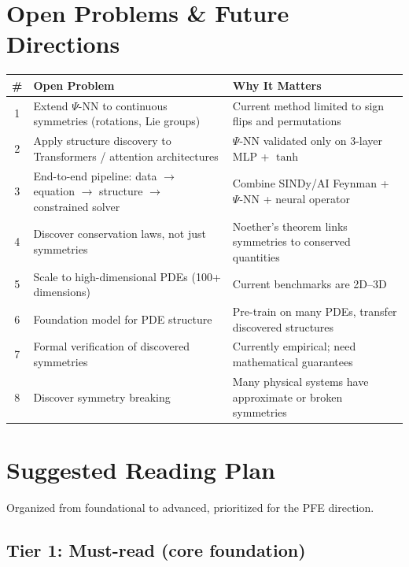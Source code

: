 \documentclass[11pt,a4paper]{article}
\begin{document}
\section{Open Problems \& Future Directions}

\begin{center}
\renewcommand{\arraystretch}{1.4}
\begin{tabular}{@{}c p{5cm} p{6.5cm}@{}}
\toprule
\textbf{\#} & \textbf{Open Problem} & \textbf{Why It Matters} \\
\midrule
1 & Extend $\Psi$-NN to continuous symmetries (rotations, Lie groups) & Current method limited to sign flips and permutations \\
2 & Apply structure discovery to Transformers / attention architectures & $\Psi$-NN validated only on 3-layer MLP + $\tanh$ \\
3 & End-to-end pipeline: data $\to$ equation $\to$ structure $\to$ constrained solver & Combine SINDy/AI Feynman + $\Psi$-NN + neural operator \\
4 & Discover conservation laws, not just symmetries & Noether's theorem links symmetries to conserved quantities \\
5 & Scale to high-dimensional PDEs (100+ dimensions) & Current benchmarks are 2D--3D \\
6 & Foundation model for PDE structure & Pre-train on many PDEs, transfer discovered structures \\
7 & Formal verification of discovered symmetries & Currently empirical; need mathematical guarantees \\
8 & Discover symmetry breaking & Many physical systems have approximate or broken symmetries \\
\bottomrule
\end{tabular}
\end{center}

\section{Suggested Reading Plan}

Organized from foundational to advanced, prioritized for the PFE direction.

\subsection{Tier 1: Must-read (core foundation)}
\end{document}
